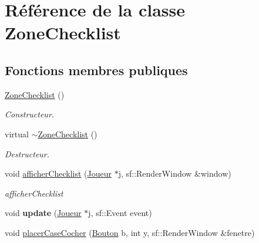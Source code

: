 \hypertarget{classZoneChecklist}{\section{\-Référence de la classe \-Zone\-Checklist}
\label{classZoneChecklist}
}
\subsection*{\-Fonctions membres publiques}
\begin{DoxyCompactItemize}
\item 
\hypertarget{classZoneChecklist_aee5e8750e39ef396f708fdfec48eca8c}{\hyperlink{classZoneChecklist_aee5e8750e39ef396f708fdfec48eca8c}{\-Zone\-Checklist} ()}\label{classZoneChecklist_aee5e8750e39ef396f708fdfec48eca8c}

\begin{DoxyCompactList}\small\item\em \-Constructeur. \end{DoxyCompactList}\item 
\hypertarget{classZoneChecklist_a1ffde7f6689c34844d38c527a87a7740}{virtual \hyperlink{classZoneChecklist_a1ffde7f6689c34844d38c527a87a7740}{$\sim$\-Zone\-Checklist} ()}\label{classZoneChecklist_a1ffde7f6689c34844d38c527a87a7740}

\begin{DoxyCompactList}\small\item\em \-Destructeur. \end{DoxyCompactList}\item 
\hypertarget{classZoneChecklist_a08e07cd3db2e76f1d33a0e3b26ec32eb}{void \hyperlink{classZoneChecklist_a08e07cd3db2e76f1d33a0e3b26ec32eb}{afficher\-Checklist} (\hyperlink{classJoueur}{\-Joueur} $\ast$j, sf\-::\-Render\-Window \&window)}\label{classZoneChecklist_a08e07cd3db2e76f1d33a0e3b26ec32eb}

\begin{DoxyCompactList}\small\item\em afficher\-Checklist \end{DoxyCompactList}\item 
\hypertarget{classZoneChecklist_a5cb52a1aff880ce982ab002cafecce97}{void {\bfseries update} (\hyperlink{classJoueur}{\-Joueur} $\ast$j, sf\-::\-Event event)}\label{classZoneChecklist_a5cb52a1aff880ce982ab002cafecce97}

\item 
\hypertarget{classZoneChecklist_a31c52e893fe409f1dd2860eb9f28ce81}{void \hyperlink{classZoneChecklist_a31c52e893fe409f1dd2860eb9f28ce81}{placer\-Case\-Cocher} (\hyperlink{classBouton}{\-Bouton} b, int y, sf\-::\-Render\-Window \&fenetre)}\label{classZoneChecklist_a31c52e893fe409f1dd2860eb9f28ce81}


\end{DoxyCompactItemize}
